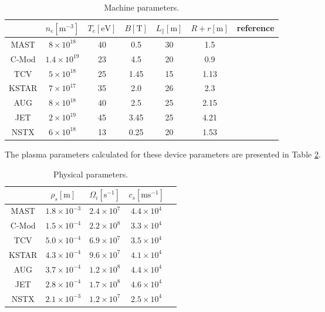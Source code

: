 \begin{table}[h!]
	\begin{center}
		\caption{Machine parameters.}
		\label{tab:machine_parameters}
		\begin{tabular}{c|c c c c c|c} 
			 & $n_e[\mathrm{m}^{-3}]$ & $T_e[\mathrm{eV}]$ & $B[\mathrm{T}]$ & $L_\parallel[\mathrm{m}]$ & $R+r[\mathrm{m}]$ & reference\\
			\hline
			MAST & $8\times 10^{18}$ & 40 & 0.5 & 30 & 1.5 & \cite{easy2016investigation}\\
			C-Mod & $1.4\times 10^{19}$ & 23 & 4.5 & 20 & 0.9 & \cite{terry2003observations}\\
			TCV & $5\times 10^{18}$ & 25 & 1.45 & 15 & 1.13  & \cite{nespoli2017blob,wensing2019solps}\\
			KSTAR & $7\times 10^{17}$ & 35 & 2.0 & 26 & 2.3 & \cite{bak2015investigation} \\
			AUG & $8\times 10^{18}$ & 40 & 2.5 & 25 & 2.15 & \cite{militello2011multi} \\
			JET & $2\times 10^{19}$ & 45 & 3.45 & 25 & 4.21 & \cite{fundamenski2007dissipative}\\
			NSTX & $6\times 10^{18}$ & 13 & 0.25 & 20 & 1.53 & \cite{terry2003observations}
		\end{tabular}
	\end{center}
\end{table} 
The plasma parameters calculated for these device parameters are presented in Table \ref{tab:plasma}.
\begin{table}[h!]
	\begin{center}
		\caption{Physical parameters.}
		\label{tab:plasma}
		\begin{tabular}{c|c c c c} 
		 & $\rho_s[\mathrm{m}]$ &$\Omega_i[\mathrm{s}^{-1}]$&$c_s[\mathrm{ms}^{-1}]$\\
			\hline
			MAST & $1.8\times 10^{-3}$ & $2.4\times 10^{7}$ & $4.4\times 10^{4}$\\
			C-Mod& $1.5\times 10^{-4}$ & $2.2\times 10^{8}$ & $3.3\times 10^{4}$\\
			TCV & $5.0\times 10^{-4}$ & $6.9\times 10^{7}$ & $3.5\times 10^{4}$\\
			KSTAR & $4.3\times 10^{-4}$ & $9.6\times 10^{7}$ & $4.1\times 10^{4}$\\
			AUG & $3.7\times 10^{-4}$ & $1.2\times 10^{8}$ & $4.4\times 10^{4}$\\
			JET & $2.8\times 10^{-4}$ & $1.7\times 10^{8}$ & $4.6\times 10^{4}$\\
			NSTX & $2.1\times 10^{-3}$ & $1.2\times 10^{7}$ & $2.5\times 10^{4}$\\
		\end{tabular}
	\end{center}
\end{table}
